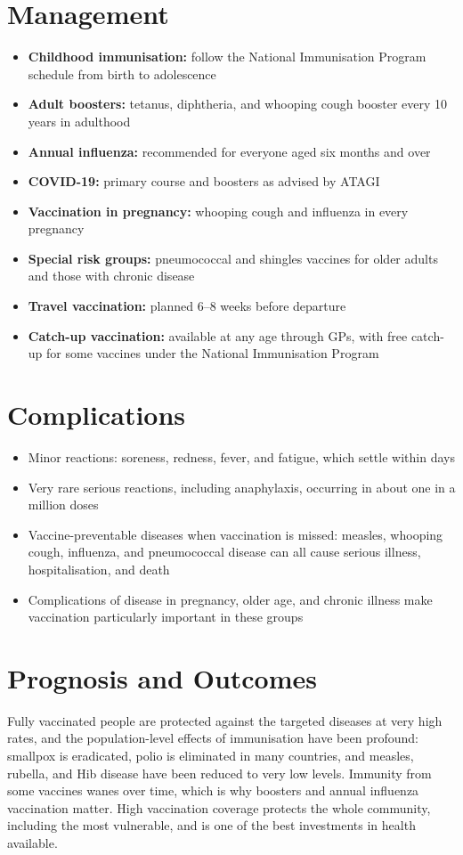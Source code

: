 \section*{Management}
\begin{itemize}
    \item \textbf{Childhood immunisation:} follow the National Immunisation Program schedule from birth to adolescence
    \item \textbf{Adult boosters:} tetanus, diphtheria, and whooping cough booster every 10 years in adulthood
    \item \textbf{Annual influenza:} recommended for everyone aged six months and over
    \item \textbf{COVID-19:} primary course and boosters as advised by ATAGI
    \item \textbf{Vaccination in pregnancy:} whooping cough and influenza in every pregnancy
    \item \textbf{Special risk groups:} pneumococcal and shingles vaccines for older adults and those with chronic disease
    \item \textbf{Travel vaccination:} planned 6--8 weeks before departure
    \item \textbf{Catch-up vaccination:} available at any age through GPs, with free catch-up for some vaccines under the National Immunisation Program
\end{itemize}

\section*{Complications}
\begin{itemize}
    \item Minor reactions: soreness, redness, fever, and fatigue, which settle within days
    \item Very rare serious reactions, including anaphylaxis, occurring in about one in a million doses
    \item Vaccine-preventable diseases when vaccination is missed: measles, whooping cough, influenza, and pneumococcal disease can all cause serious illness, hospitalisation, and death
    \item Complications of disease in pregnancy, older age, and chronic illness make vaccination particularly important in these groups
\end{itemize}

\section*{Prognosis and Outcomes}
Fully vaccinated people are protected against the targeted diseases at very high rates, and the population-level effects of immunisation have been profound: smallpox is eradicated, polio is eliminated in many countries, and measles, rubella, and Hib disease have been reduced to very low levels. Immunity from some vaccines wanes over time, which is why boosters and annual influenza vaccination matter. High vaccination coverage protects the whole community, including the most vulnerable, and is one of the best investments in health available.

